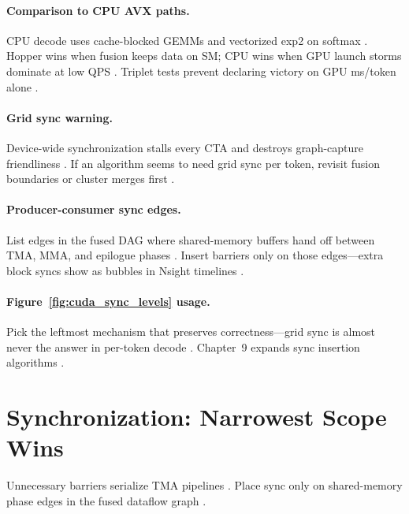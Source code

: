 \paragraph{Comparison to CPU AVX paths.}
CPU decode uses cache-blocked GEMMs and vectorized exp2 on softmax \citep{dlbook,patel2025llminference,amd2024xdna}.
Hopper wins when fusion keeps data on SM; CPU wins when GPU launch storms dominate at low QPS \citep{taxbreak2026,memoryfloor2026,yirage2026}.
Triplet tests prevent declaring victory on GPU ms/token alone \citep{amd2024aie,patel2025llminference}.

\paragraph{Grid sync warning.}
Device-wide synchronization stalls every CTA and destroys graph-capture friendliness \citep{taxbreak2026,nvidia2024cudagraphs,nvidia2022hopper}.
If an algorithm seems to need grid sync per token, revisit fusion boundaries or cluster merges first \citep{dao2023flashdecoding,yirage2026}.

\paragraph{Producer-consumer sync edges.}
List edges in the fused DAG where shared-memory buffers hand off between TMA, MMA, and epilogue phases \citep{yirage2026,chen2020compilerbasedhardw,semianalysis2024tma}.
Insert barriers only on those edges---extra block syncs show as bubbles in Nsight timelines \citep{patel2025llminference,dao2022flashattention}.

\paragraph{Figure~\ref{fig:cuda_sync_levels} usage.}
Pick the leftmost mechanism that preserves correctness---grid sync is almost never the answer in per-token decode \citep{taxbreak2026,nvidia2022hopper,dao2022flashattention}.
Chapter~9 expands sync insertion algorithms \citep{yirage2026,chen2020compilerbasedhardw}.

\section{Synchronization: Narrowest Scope Wins}
\label{sec:sync_mechanisms}

Unnecessary barriers serialize TMA pipelines \citep{semianalysis2024tma}.
Place sync only on shared-memory phase edges in the fused dataflow graph \citep{yirage2026,chen2020compilerbasedhardw}.

